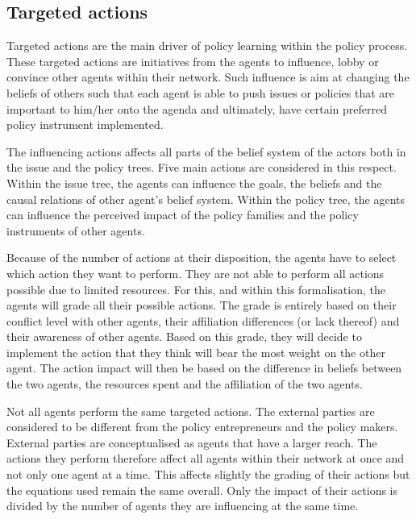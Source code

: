 \documentclass[11pt]{article}
\begin{document}
\subsection{Targeted actions}
\label{ssec:}

Targeted actions are the main driver of policy learning within the policy process. These targeted actions are initiatives from the agents to influence, lobby or convince other agents within their network. Such influence is aim at changing the beliefs of others such that each agent is able to push issues or policies that are important to him/her onto the agenda and ultimately, have certain preferred policy instrument implemented.

The influencing actions affects all parts of the belief system of the actors both in the issue and the policy trees. Five main actions are considered in this respect. Within the issue tree, the agents can influence the goals, the beliefs and the causal relations of other agent's belief system. Within the policy tree, the agents can influence the perceived impact of the policy families and the policy instruments of other agents.

Because of the number of actions at their disposition, the agents have to select which action they want to perform. They are not able to perform all actions possible due to limited resources. For this, and within this formalisation, the agents will grade all their possible actions. The grade is entirely based on their conflict level with other agents, their affiliation differences (or lack thereof) and their awareness of other agents. Based on this grade, they will decide to implement the action that they think will bear the most weight on the other agent. The action impact will then be based on the difference in beliefs between the two agents, the resources spent and the affiliation of the two agents.

Not all agents perform the same targeted actions. The external parties are considered to be different from the policy entrepreneurs and the policy makers. External parties are conceptualised as agents that have a larger reach. The actions they perform therefore affect all agents within their network at once and not only one agent at a time. This affects slightly the grading of their actions but the equations used remain the same overall. Only the impact of their actions is divided by the number of agents they are influencing at the same time.


\end{document}
